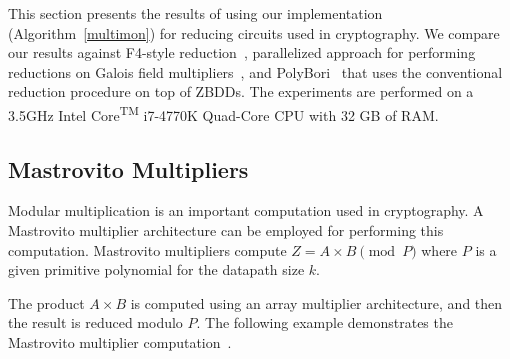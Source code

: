 This section presents the results of using our implementation (Algorithm~\ref{multimon}) for reducing
circuits used in cryptography. We compare our results against F4-style reduction~\cite{pruss:tcad}, 
parallelized approach for performing reductions on Galois field multipliers~\cite{cunxi:aspdac17}, 
and PolyBori~\cite{polybori:2009} that uses the conventional reduction procedure on top of ZBDDs. 
The experiments are performed on a 3.5GHz Intel 
Core\textsuperscript{TM} i7-4770K Quad-Core CPU with 32 GB of RAM. 

\subsection{Mastrovito Multipliers}

Modular multiplication is an important computation used in cryptography. 
A Mastrovito multiplier architecture can be employed for performing this computation.
Mastrovito multipliers compute $Z = A\times B \pmod{
  P}$ where $P$ is a given primitive polynomial for the datapath size
$k$. 

The product $A \times B$ is computed using an array multiplier architecture, and then the result is reduced modulo $P$.
The following example demonstrates the Mastrovito multiplier computation~\cite{lv:tcad2013}.


